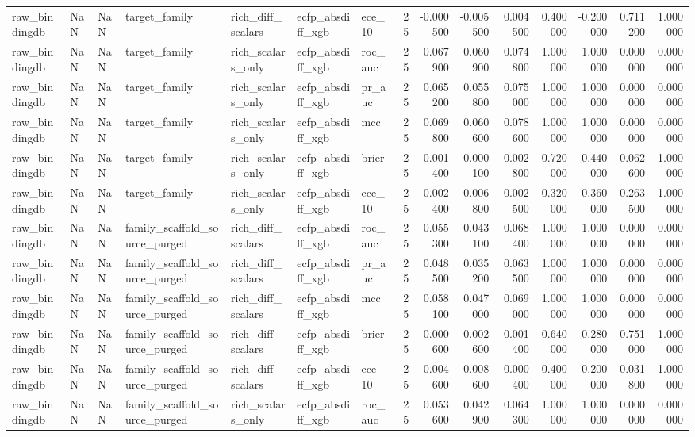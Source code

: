 \begin{longtable}{lllllllrrrrrrrr}
raw\_bindingdb & NaN & NaN & target\_family & rich\_diff\_scalars & ecfp\_absdiff\_xgb & ece\_10 & 25 & -0.000500 & -0.005500 & 0.004500 & 0.400000 & -0.200000 & 0.711200 & 1.000000 \\
raw\_bindingdb & NaN & NaN & target\_family & rich\_scalars\_only & ecfp\_absdiff\_xgb & roc\_auc & 25 & 0.067900 & 0.060900 & 0.074800 & 1.000000 & 1.000000 & 0.000000 & 0.000000 \\
raw\_bindingdb & NaN & NaN & target\_family & rich\_scalars\_only & ecfp\_absdiff\_xgb & pr\_auc & 25 & 0.065200 & 0.055800 & 0.075000 & 1.000000 & 1.000000 & 0.000000 & 0.000000 \\
raw\_bindingdb & NaN & NaN & target\_family & rich\_scalars\_only & ecfp\_absdiff\_xgb & mcc & 25 & 0.069800 & 0.060600 & 0.078600 & 1.000000 & 1.000000 & 0.000000 & 0.000000 \\
raw\_bindingdb & NaN & NaN & target\_family & rich\_scalars\_only & ecfp\_absdiff\_xgb & brier & 25 & 0.001400 & 0.000100 & 0.002800 & 0.720000 & 0.440000 & 0.062600 & 1.000000 \\
raw\_bindingdb & NaN & NaN & target\_family & rich\_scalars\_only & ecfp\_absdiff\_xgb & ece\_10 & 25 & -0.002400 & -0.006800 & 0.002500 & 0.320000 & -0.360000 & 0.263500 & 1.000000 \\
raw\_bindingdb & NaN & NaN & family\_scaffold\_source\_purged & rich\_diff\_scalars & ecfp\_absdiff\_xgb & roc\_auc & 25 & 0.055300 & 0.043100 & 0.068400 & 1.000000 & 1.000000 & 0.000000 & 0.000000 \\
raw\_bindingdb & NaN & NaN & family\_scaffold\_source\_purged & rich\_diff\_scalars & ecfp\_absdiff\_xgb & pr\_auc & 25 & 0.048500 & 0.035200 & 0.063500 & 1.000000 & 1.000000 & 0.000000 & 0.000000 \\
raw\_bindingdb & NaN & NaN & family\_scaffold\_source\_purged & rich\_diff\_scalars & ecfp\_absdiff\_xgb & mcc & 25 & 0.058100 & 0.047000 & 0.069000 & 1.000000 & 1.000000 & 0.000000 & 0.000000 \\
raw\_bindingdb & NaN & NaN & family\_scaffold\_source\_purged & rich\_diff\_scalars & ecfp\_absdiff\_xgb & brier & 25 & -0.000600 & -0.002600 & 0.001400 & 0.640000 & 0.280000 & 0.751000 & 1.000000 \\
raw\_bindingdb & NaN & NaN & family\_scaffold\_source\_purged & rich\_diff\_scalars & ecfp\_absdiff\_xgb & ece\_10 & 25 & -0.004600 & -0.008600 & -0.000400 & 0.400000 & -0.200000 & 0.031800 & 1.000000 \\
raw\_bindingdb & NaN & NaN & family\_scaffold\_source\_purged & rich\_scalars\_only & ecfp\_absdiff\_xgb & roc\_auc & 25 & 0.053600 & 0.042900 & 0.064300 & 1.000000 & 1.000000 & 0.000000 & 0.000000 \\

\end{longtable}
